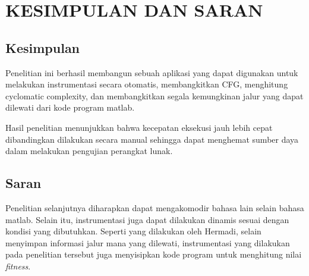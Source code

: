 \section*{KESIMPULAN DAN SARAN}

\subsection*{Kesimpulan}

Penelitian ini berhasil membangun sebuah aplikasi yang dapat digunakan untuk melakukan instrumentasi secara otomatis, membangkitkan CFG, menghitung cyclomatic complexity, dan membangkitkan segala kemungkinan jalur yang dapat dilewati dari kode program matlab. 

Hasil penelitian menunjukkan bahwa kecepatan eksekusi jauh lebih cepat dibandingkan dilakukan secara manual sehingga dapat menghemat sumber daya dalam melakukan pengujian perangkat lunak.

\subsection*{Saran}

Penelitian selanjutnya diharapkan dapat mengakomodir bahasa lain selain bahasa matlab. Selain itu, instrumentasi juga dapat dilakukan dinamis sesuai dengan kondisi yang dibutuhkan. Seperti yang dilakukan oleh Hermadi, selain menyimpan informasi jalur mana yang dilewati, instrumentasi yang dilakukan pada  penelitian tersebut juga menyisipkan kode program untuk menghitung nilai \textit{fitness}.